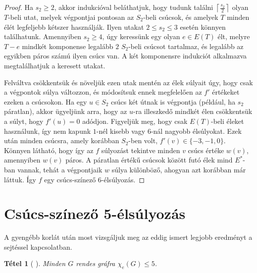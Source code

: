 \documentclass[12pt, a4paper]{report}
\newtheorem{tét}{Tétel}[section]
\theoremstyle{remark}
\theoremstyle{definition}
\begin{document}
\begin{proof}
Ha $s_2 \geq 2$, akkor indukcióval beláthatjuk, hogy tudunk találni $\left\lceil \frac{s_2}{2} \right\rceil$ olyan $T$-beli utat, melyek végpontjai pontosan az $S_2$-beli csúcsok, és amelyek $T$ minden élét legfeljebb kétszer használják. Ilyen utakat $2 \leq s_2 \leq 3$ esetén könnyen találhatunk. Amennyiben $s_2 \geq 4$, úgy keressünk egy olyan $e \in E(T)$ élt, melyre $T-e$ mindkét komponense legalább $2$ $S_2$-beli csúcsot tartalmaz, és legalább az egyikben páros számú ilyen csúcs van. A két komponensre indukciót alkalmazva megtalálhatjuk a keresett utakat.

Felváltva csökkentsük és növeljük ezen utak mentén az élek súlyait úgy, hogy csak a végpontok súlya változzon, és módosítsuk ennek megfelelően az $f'$ értékeket ezeken a csúcsokon. Ha egy $u \in S_2$ csúcs két útnak is végpontja (például, ha $s_2$ páratlan), akkor ügyeljünk arra, hogy az $u$-ra illeszkedő mindkét élen csökkentsük a súlyt, hogy $f'(u) = 0$ adódjon. Figyeljük meg, hogy csak $E(T)$-beli éleket használunk, így nem kapunk $1$-nél kisebb vagy $6$-nál nagyobb élsúlyokat. Ezek után minden csúcsra, amely korábban $S_2$-ben volt, $f'(v) \in \lbrace -3, -1, 0 \rbrace$. Könnyen látható, hogy így az $f$ súlyozást tekintve minden $v$ csúcs értéke $w(v)$, amennyiben $w(v)$ páros. A páratlan értékű csúcsok között futó élek mind $E^*$-ban vannak, tehát a végpontjaik $w$ súlya különböző, ahogyan azt korábban már láttuk. Így $f$ egy csúcs-színező $6$-élsúlyozás.
\end{proof}

\section{Csúcs-színező 5-élsúlyozás}
A gyengébb korlát után most vizsgáljuk meg az eddig ismert legjobb eredményt a sejtéssel kapcsolatban. 

\begin{tét}[\citeauthor{Kalkowski2010} \cite{Kalkowski2010}]
Minden $G$ rendes gráfra $\chi_e(G) \leq 5$.
\end{tét}
\end{document}
